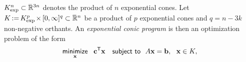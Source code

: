 \documentclass{article}
\newcommand\discard[1]{}
\newcommand\voli[1]{{\color{olicolor}\textbf{$\boldsymbol\{$Oli: }#1 \textbf{$\boldsymbol\}$}}}
\begin{document}
\discard{\voli{It is also sometimes called the ``relative entropy'' cone, because if $\mat m, \mat p \in \Delta^{n-1} \subset \mathbb R^n$ are points on a probability simplex, then $(-\mat u, \mat m, \mat p) \in K_{\exp}^n$ if and only if $\mat u$ is an upper bound on $\mat m \log (\nicefrac{\mat m}{\mat p})$, the pointwise contribution to relative entropy at each outcome.}}
%
$K_{\exp}^n \subset \smash{\mskip1mu\overline{\mskip-1mu\mathbb R\!}\,}\vphantom{R}^{3n}$ denotes the 
product
of $n$ exponential cones. 
Let $K \mskip-2mu := \mskip-2mu K_{\exp}^p \mskip-2mu \times \mskip-1mu
[0, \infty]^q 
\subset \smash{\mskip1mu\overline{\mskip-1mu\mathbb R\!}\,}^n$ be a product of $p$ exponential cones and $q = n - 3k$ non-negative orthants.
An \emph{exponential conic program} is then an optimization problem of the form
\begin{equation}
    \minimize
        _{\mat x}
        ~~ \mat c^{\sf T} \mat x
    \quad\subjto
    ~~ A \mat x = \mat b,~~\mat x \in 
        K,
        \label{eq:exp-conic-program}
\end{equation}
\end{document}
